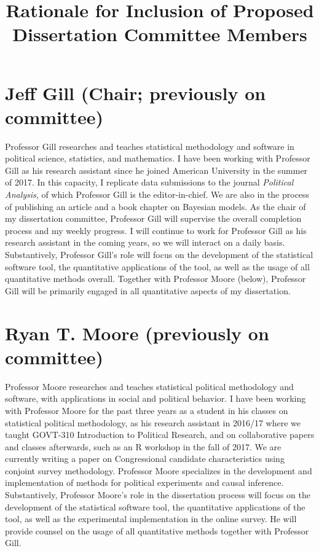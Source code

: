 \documentclass[11pt]{article}
\title{Rationale for Inclusion of Proposed Dissertation Committee Members}
\date{}
\begin{document}
\maketitle

\vspace{-1.6cm}

\section*{Jeff Gill (Chair; previously on committee)}

\vspace{0.3cm}

Professor Gill researches and teaches statistical methodology and software in political science, statistics, and mathematics. I have been working with Professor Gill as his research assistant since he joined American University in the summer of 2017. In this capacity, I replicate data submissions to the journal \textit{Political Analysis}, of which Professor Gill is the editor-in-chief. We are also in the process of publishing an article and a book chapter on Bayesian models. As the chair of my dissertation committee, Professor Gill will supervise the overall completion process and my weekly progress. I will continue to work for Professor Gill as his research assistant in the coming years, so we will interact on a daily basis. Substantively, Professor Gill's role will focus on the development of the statistical software tool, the quantitative applications of the tool, as well as the usage of all quantitative methods overall. Together with Professor Moore (below), Professor Gill will be primarily engaged in all quantitative aspects of my dissertation.

\section*{Ryan T. Moore (previously on committee)}

\vspace{0.3cm}

Professor Moore researches and teaches statistical political methodology and software, with applications in social and political behavior. I have been working with Professor Moore for the past three years as a student in his classes on statistical political methodology, as his research assistant in 2016/17 where we taught GOVT-310 Introduction to Political Research, and on collaborative papers and classes afterwards, such as an R workshop in the fall of 2017. We are currently writing a paper on Congressional candidate characteristics using conjoint survey methodology. Professor Moore specializes in the development and implementation of methods for political experiments and causal inference. Substantively, Professor Moore's role in the dissertation process will focus on the development of the statistical software tool, the quantitative applications of the tool, as well as the experimental implementation in the online survey. He will provide counsel on the usage of all quantitative methods together with Professor Gill.
\end{document}
